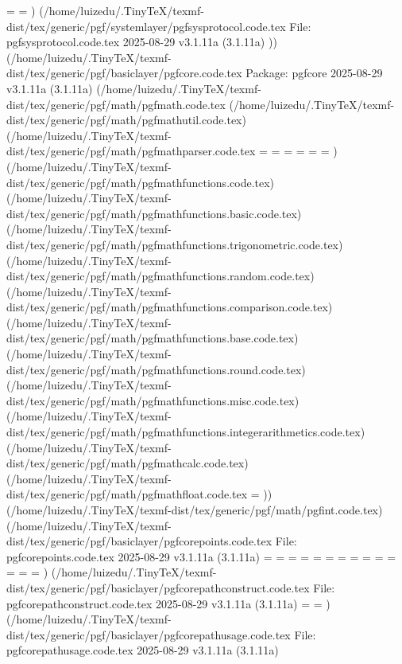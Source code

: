 \pgfsyssoftpath@smallbuffer@items=
\pgfsyssoftpath@bigbuffer@items=
) (/home/luizedu/.TinyTeX/texmf-dist/tex/generic/pgf/systemlayer/pgfsysprotocol.code.tex
File: pgfsysprotocol.code.tex 2025-08-29 v3.1.11a (3.1.11a)
)) (/home/luizedu/.TinyTeX/texmf-dist/tex/generic/pgf/basiclayer/pgfcore.code.tex
Package: pgfcore 2025-08-29 v3.1.11a (3.1.11a)
(/home/luizedu/.TinyTeX/texmf-dist/tex/generic/pgf/math/pgfmath.code.tex (/home/luizedu/.TinyTeX/texmf-dist/tex/generic/pgf/math/pgfmathutil.code.tex) (/home/luizedu/.TinyTeX/texmf-dist/tex/generic/pgf/math/pgfmathparser.code.tex
\pgfmath@dimen=
\pgfmath@count=
\pgfmath@box=
\pgfmath@toks=
\pgfmath@stack@operand=
\pgfmath@stack@operation=
) (/home/luizedu/.TinyTeX/texmf-dist/tex/generic/pgf/math/pgfmathfunctions.code.tex) (/home/luizedu/.TinyTeX/texmf-dist/tex/generic/pgf/math/pgfmathfunctions.basic.code.tex) (/home/luizedu/.TinyTeX/texmf-dist/tex/generic/pgf/math/pgfmathfunctions.trigonometric.code.tex) (/home/luizedu/.TinyTeX/texmf-dist/tex/generic/pgf/math/pgfmathfunctions.random.code.tex) (/home/luizedu/.TinyTeX/texmf-dist/tex/generic/pgf/math/pgfmathfunctions.comparison.code.tex) (/home/luizedu/.TinyTeX/texmf-dist/tex/generic/pgf/math/pgfmathfunctions.base.code.tex) (/home/luizedu/.TinyTeX/texmf-dist/tex/generic/pgf/math/pgfmathfunctions.round.code.tex) (/home/luizedu/.TinyTeX/texmf-dist/tex/generic/pgf/math/pgfmathfunctions.misc.code.tex) (/home/luizedu/.TinyTeX/texmf-dist/tex/generic/pgf/math/pgfmathfunctions.integerarithmetics.code.tex) (/home/luizedu/.TinyTeX/texmf-dist/tex/generic/pgf/math/pgfmathcalc.code.tex) (/home/luizedu/.TinyTeX/texmf-dist/tex/generic/pgf/math/pgfmathfloat.code.tex
\c@pgfmathroundto@lastzeros=
)) (/home/luizedu/.TinyTeX/texmf-dist/tex/generic/pgf/math/pgfint.code.tex) (/home/luizedu/.TinyTeX/texmf-dist/tex/generic/pgf/basiclayer/pgfcorepoints.code.tex
File: pgfcorepoints.code.tex 2025-08-29 v3.1.11a (3.1.11a)
\pgf@picminx=
\pgf@picmaxx=
\pgf@picminy=
\pgf@picmaxy=
\pgf@pathminx=
\pgf@pathmaxx=
\pgf@pathminy=
\pgf@pathmaxy=
\pgf@xx=
\pgf@xy=
\pgf@yx=
\pgf@yy=
\pgf@zx=
\pgf@zy=
) (/home/luizedu/.TinyTeX/texmf-dist/tex/generic/pgf/basiclayer/pgfcorepathconstruct.code.tex
File: pgfcorepathconstruct.code.tex 2025-08-29 v3.1.11a (3.1.11a)
\pgf@path@lastx=
\pgf@path@lasty=
) (/home/luizedu/.TinyTeX/texmf-dist/tex/generic/pgf/basiclayer/pgfcorepathusage.code.tex
File: pgfcorepathusage.code.tex 2025-08-29 v3.1.11a (3.1.11a)
